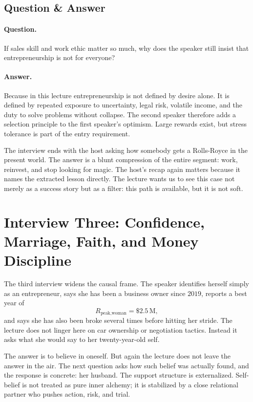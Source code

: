\subsection{Question \& Answer}

\paragraph{Question.} If sales skill and work ethic matter so much, why does the speaker still insist that entrepreneurship is not for everyone?

\paragraph{Answer.} Because in this lecture entrepreneurship is not defined by desire alone. It is defined by repeated exposure to uncertainty, legal risk, volatile income, and the duty to solve problems without collapse. The second speaker therefore adds a selection principle to the first speaker's optimism. Large rewards exist, but stress tolerance is part of the entry requirement.

The interview ends with the host asking how somebody gets a Rolls-Royce in the present world. The answer is a blunt compression of the entire segment: work, reinvest, and stop looking for magic. The host's recap again matters because it names the extracted lesson directly. The lecture wants us to see this case not merely as a success story but as a filter: this path is available, but it is not soft.

\section{Interview Three: Confidence, Marriage, Faith, and Money Discipline}

The third interview widens the causal frame. The speaker identifies herself simply as an entrepreneur, says she has been a business owner since \(2019\), reports a best year of
\begin{equation}
R_{\text{peak,woman}}=\text{\$}2.5\,\mathrm{M},
\end{equation}
and says she has also been broke several times before hitting her stride. The lecture does not linger here on car ownership or negotiation tactics. Instead it asks what she would say to her twenty-year-old self.

The answer is to believe in oneself. But again the lecture does not leave the answer in the air. The next question asks how such belief was actually found, and the response is concrete: her husband. The support structure is externalized. Self-belief is not treated as pure inner alchemy; it is stabilized by a close relational partner who pushes action, risk, and trial.

